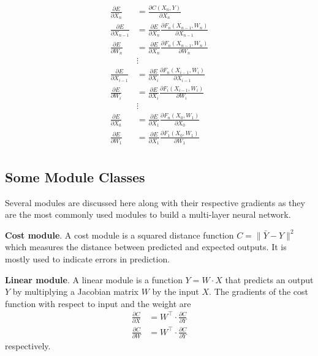\begin{align*}
 \frac{\partial E}{\partial X_n} &= \frac{\partial C(X_n, Y)}{\partial X_n}\\
 \frac{\partial E}{\partial X_{n-1}} &=\frac{\partial E}{\partial X_n} \frac{\partial F_n(X_{n-1},W_n)}{\partial X_{n-1}} \\  
 \frac{\partial E}{\partial W_n} &=\frac{\partial E}{\partial X_n} \frac{\partial F_n(X_{n-1},W_n)}{\partial W_n} \\
 &\vdots\\ 
 \frac{\partial E}{\partial X_{i-1}} &=\frac{\partial E}{\partial X_i} \frac{\partial F_n(X_{i-1},W_i)}{\partial X_{i-1}} \\  
 \frac{\partial E}{\partial W_i} &=\frac{\partial E}{\partial X_i} \frac{\partial F_i(X_{i-1},W_i)}{\partial W_i} \\
   &\vdots\\ 
 \frac{\partial E}{\partial X_0} &=\frac{\partial E}{\partial X_1} \frac{\partial F_n(X_0,W_1)}{\partial X_0} \\  
 \frac{\partial E}{\partial W_1} &=\frac{\partial E}{\partial X_1} \frac{\partial F_1(X_0,W_1)}{\partial W_1} \\
\end{align*}

\subsection{Some Module Classes}\label{ssc:Module Classes}

Several modules are discussed here along with their respective gradients as they are the most commonly used modules to build a multi-layer neural network.

\textbf{Cost module}.
A cost module is a squared distance function $C=\|\bar{Y}-Y\|^2$ which measures the distance between predicted and expected outputs.
It is mostly used to indicate errors in prediction.

\textbf{Linear module}.
A linear module is a function $Y=W\cdot X$ that predicts an output $Y$ by multiplying a Jacobian matrix $W$ by the input $X$.
The gradients of the cost function with respect to input and the weight are 
\begin{align*}
    \frac{\partial C}{\partial X} &= W^\top \cdot \frac{\partial C}{\partial Y} \\
    \frac{\partial C}{\partial W} &= W^\top \cdot \frac{\partial C}{\partial Y} 
\end{align*}
respectively.

